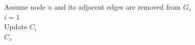 \begin{function8}
\caption{$CommunityAfterNodeRemoval(u,C_s)$}
Assume node $u$ and its adjacent edges are removed from $G_s$\\
$i=1$\\
Update $C_i$\\%
\Return $C_s$   
\end{function8}



